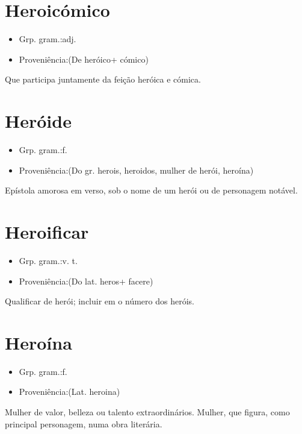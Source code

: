 \documentclass{article}
\begin{document}
\section{Heroicómico}
\begin{itemize}
\item {Grp. gram.:adj.}
\end{itemize}
\begin{itemize}
\item {Proveniência:(De \textunderscore heróico\textunderscore  + \textunderscore cómico\textunderscore )}
\end{itemize}
Que participa juntamente da feição heróica e cómica.
\section{Heróide}
\begin{itemize}
\item {Grp. gram.:f.}
\end{itemize}
\begin{itemize}
\item {Proveniência:(Do gr. \textunderscore herois\textunderscore , \textunderscore heroidos\textunderscore , mulher de herói, heroína)}
\end{itemize}
Epístola amorosa em verso, sob o nome de um herói ou de personagem notável.
\section{Heroificar}
\begin{itemize}
\item {Grp. gram.:v. t.}
\end{itemize}
\begin{itemize}
\item {Proveniência:(Do lat. \textunderscore heros\textunderscore  + \textunderscore facere\textunderscore )}
\end{itemize}
Qualificar de herói; incluir em o número dos heróis.
\section{Heroína}
\begin{itemize}
\item {Grp. gram.:f.}
\end{itemize}
\begin{itemize}
\item {Proveniência:(Lat. \textunderscore heroina\textunderscore )}
\end{itemize}
Mulher de valor, belleza ou talento extraordinários.
Mulher, que figura, como principal personagem, numa obra literária.
\end{document}
